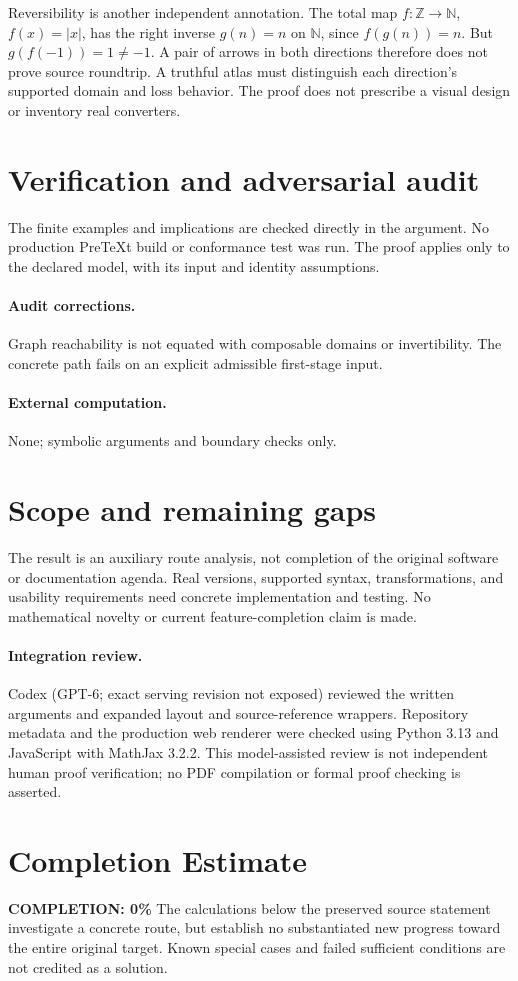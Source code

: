 \documentclass[11pt]{article}
\begin{document}
Reversibility is another independent annotation. The total map $f:\mathbb Z\to\mathbb N$, $f(x)=|x|$, has the right inverse $g(n)=n$ on $\mathbb N$, since $f(g(n))=n$. But $g(f(-1))=1\ne-1$. A pair of arrows in both directions therefore does not prove source roundtrip. A truthful atlas must distinguish each direction's supported domain and loss behavior. The proof does not prescribe a visual design or inventory real converters.
\section{Verification and adversarial audit}
The finite examples and implications are checked directly in the argument. No production PreTeXt build or conformance test was run. The proof applies only to the declared model, with its input and identity assumptions.
\paragraph{Audit corrections.} Graph reachability is not equated with composable domains or invertibility. The concrete path fails on an explicit admissible first-stage input.
\paragraph{External computation.} None; symbolic arguments and boundary checks only.
\section{Scope and remaining gaps}
The result is an auxiliary route analysis, not completion of the original software or documentation agenda. Real versions, supported syntax, transformations, and usability requirements need concrete implementation and testing. No mathematical novelty or current feature-completion claim is made.
\paragraph{Integration review.} Codex (GPT-6; exact serving revision not exposed) reviewed the written arguments and expanded layout and source-reference wrappers. Repository metadata and the production web renderer were checked using Python 3.13 and JavaScript with MathJax 3.2.2. This model-assisted review is not independent human proof verification; no PDF compilation or formal proof checking is asserted.

\section{Completion Estimate}
\noindent\textbf{COMPLETION: 0\%}
The calculations below the preserved source statement investigate a concrete route,
but establish no substantiated new progress toward the entire original target.
Known special cases and failed sufficient conditions are not credited as a solution.
\end{document}
